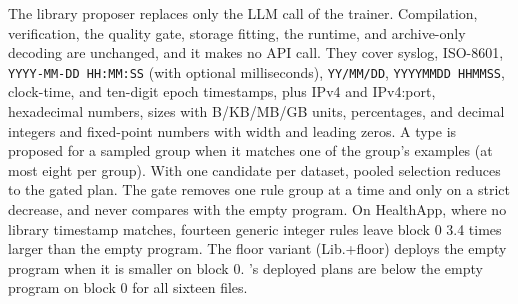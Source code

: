 The library proposer replaces only the LLM call of the trainer. Compilation, verification, the quality gate, storage fitting, the runtime, and archive-only decoding are unchanged, and it makes no API call. They cover syslog, ISO-8601, \texttt{YYYY-MM-DD HH:MM:SS} (with optional milliseconds), \texttt{YY/MM/DD}, \texttt{YYYYMMDD HHMMSS}, clock-time, and ten-digit epoch timestamps, plus IPv4 and IPv4:port, hexadecimal numbers, sizes with B/KB/MB/GB units, percentages, and decimal integers and fixed-point numbers with width and leading zeros. A type is proposed for a sampled group when it matches one of the group\textquoteright s examples (at most eight per group). With one candidate per dataset, pooled selection reduces to the gated plan. The gate removes one rule group at a time and only on a strict decrease, and never compares with the empty program. On HealthApp, where no library timestamp matches, fourteen generic integer rules leave block 0 3.4 times larger than the empty program. The floor variant (Lib.+floor) deploys the empty program when it is smaller on block 0. \tool\textquoteright s deployed plans are below the empty program on block 0 for all sixteen files.

